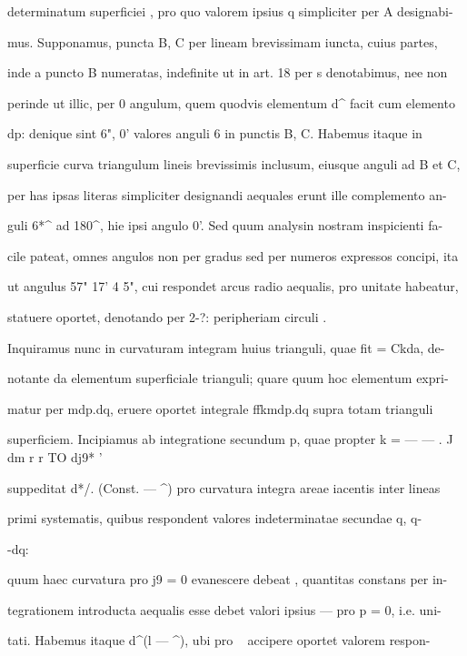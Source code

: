 \documentclass[12pt,a4paper]{article}
\begin{document}
{{{{{{determinatum  superficiei ,  pro  quo  valorem  ipsius  q  simpliciter  per  A  designabi-

mus.  Supponamus,  puncta  B,  C  per  lineam  brevissimam  iuncta,  cuius  partes,

inde  a  puncto  B  numeratas,  indefinite  ut  in  art.  18  per  s  denotabimus,  nee  non

perinde  ut  illic,  per  0  angulum,  quem  quodvis  elementum  d^  facit  cum  elemento

dp:  denique  sint  6",  0'  valores  anguli  6  in  punctis  B,  C.  Habemus  itaque  in

superficie  curva  triangulum  lineis  brevissimis  inclusum,  eiusque  anguli  ad  B  et  C,

per  has  ipsas  literas  simpliciter  designandi  aequales  erunt  ille  complemento  an-

guli 6*^  ad  180^,  hie  ipsi  angulo  0'.  Sed  quum  analysin  nostram  inspicienti  fa-

cile  pateat,  omnes  angulos  non  per  gradus  sed  per  numeros  expressos  concipi,  ita

ut  angulus  57"  17' 4 5",  cui  respondet  arcus  radio  aequalis,  pro  unitate  habeatur,

statuere  oportet,  denotando  per  2-?:  peripheriam  circuli  .

Inquiramus  nunc  in  curvaturam  integram  huius  trianguli,  quae  fit  =  Ckda,  de-

notante  da  elementum  superficiale  trianguli;  quare  quum  hoc  elementum  expri-

matur  per  mdp.dq,  eruere  oportet  integrale  ffkmdp.dq  supra  totam  trianguli

superficiem.   Incipiamus  ab  integratione  secundum  p,  quae  propter  k  =  —  — .  ^^

dm  r      r  TO     dj9*  '

suppeditat  d*/.  (Const.  — ^)  pro  curvatura  integra  areae  iacentis  inter  lineas

primi  systematis,  quibus  respondent  valores  indeterminatae  secundae  q,  q-{-dq:

quum  haec  curvatura  pro  j9  =  0  evanescere  debeat ,  quantitas  constans  per  in-

tegrationem  introducta  aequalis  esse  debet  valori  ipsius  —  pro  p  =  0,  i.e.  uni-

tati.  Habemus  itaque  d^(l  — ^),  ubi  pro  ~  accipere  oportet  valorem  respon-

}}}}}}}
\end{document}
